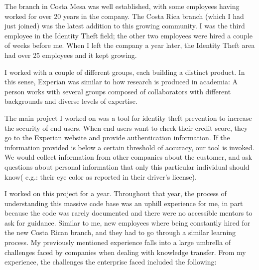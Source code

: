\documentclass[12pt, letterpaper]{article}
\begin{document}
The branch in Costa Mesa was well established, with some employees having worked for over 20 years in the company. 
The Costa Rica branch (which I had just joined) was the 
latest addition to this growing 
community. I was the third employee in the Identity Theft field; the other two employees were hired a couple of 
weeks before me. When I left the company a year later, the Identity Theft area had over 25 employees and it 
kept growing. 

I worked with a couple
of different groups, each building a distinct product. In this sense, Experian was
similar to how research 
is produced in academia: A person works with several groups composed of collaborators with different 
backgrounds and diverse levels of expertise.

The main project I worked on was a tool for identity theft prevention to increase the security of end users.
When end users want to check their credit score, they go to the Experian website and provide authentication
information. If the information provided is below a certain threshold of accuracy, our tool is invoked. We would collect 
information from other companies about the customer, and ask questions about personal information that only this particular
individual should know( e.g.: their eye color as reported in their driver's license).

I worked on this project for a year. Throughout that year, the process of understanding this massive 
code base was an uphill experience for me, in part because the code was rarely documented
and there were no accessible mentors to ask for guidance. Similar to me, new employees where being constantly hired for the new Costa Rican 
branch, and they had to go through a similar learning process. My previously mentioned experience falls into a large
umbrella of challenges faced by companies when dealing with knowledge transfer. 
From my experience, the challenges the enterprise faced included the following:
\end{document}
